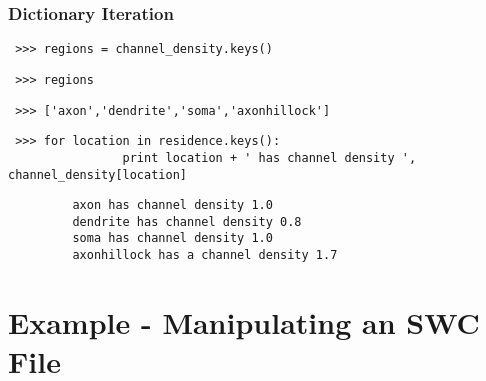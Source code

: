 \documentclass{beamer}
\begin{document}
\begin{frame}[fragile]
  
  \frametitle{Dictionary Iteration}

	  \begin{list}{\quad}{}
		  \tiny
		  \item<2-> \begin{verbatim} >>> regions = channel_density.keys() \end{verbatim}	
		  \item<3-> \begin{verbatim} >>> regions \end{verbatim}	
		  \item<4-> \begin{verbatim} >>> ['axon','dendrite','soma','axonhillock']  \end{verbatim}	

		  \item<5-> \begin{verbatim} >>> for location in residence.keys():
	        	print location + ' has channel density ',  channel_density[location]
			  \end{verbatim}

		  \item<6-> \begin{verbatim} 
		 axon has channel density 1.0
		 dendrite has channel density 0.8
		 soma has channel density 1.0
		 axonhillock has a channel density 1.7
		 \end{verbatim} 

	  \end{list}
 		  

\end{frame}



















\section{Example - Manipulating an SWC File}
\end{document}
